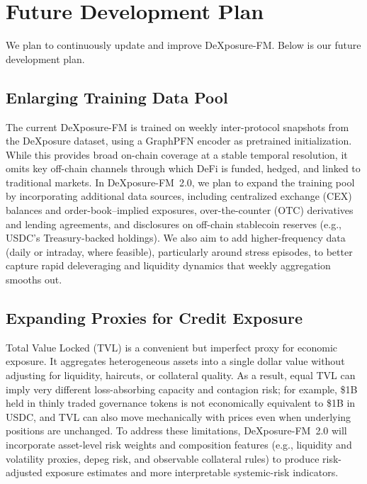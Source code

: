 \section{Future  Development Plan}

We plan to continuously update and improve DeXposure-FM. Below is our future development plan.

    
\subsection{Enlarging Training Data Pool} 
The current DeXposure-FM is trained on weekly inter-protocol snapshots from the DeXposure dataset, using a GraphPFN encoder as pretrained initialization. While this provides broad on-chain coverage at a stable temporal resolution, it omits key off-chain channels through which DeFi is funded, hedged, and linked to traditional markets. In DeXposure-FM~2.0, we plan to expand the training pool by incorporating additional data sources, including centralized exchange (CEX) balances and order-book–implied exposures, over-the-counter (OTC) derivatives and lending agreements, and disclosures on off-chain stablecoin reserves (e.g., USDC’s Treasury-backed holdings). We also aim to add higher-frequency data (daily or intraday, where feasible), particularly around stress episodes, to better capture rapid deleveraging and liquidity dynamics that weekly aggregation smooths out.

\subsection{Expanding Proxies for Credit Exposure}
Total Value Locked (TVL) is a convenient but imperfect proxy for economic exposure. It aggregates heterogeneous assets into a single dollar value without adjusting for liquidity, haircuts, or collateral quality. As a result, equal TVL can imply very different loss-absorbing capacity and contagion risk; for example, \$1B held in thinly traded governance tokens is not economically equivalent to \$1B in USDC, and TVL can also move mechanically with prices even when underlying positions are unchanged. To address these limitations, DeXposure-FM~2.0 will incorporate asset-level risk weights and composition features (e.g., liquidity and volatility proxies, depeg risk, and observable collateral rules) to produce risk-adjusted exposure estimates and more interpretable systemic-risk indicators.

